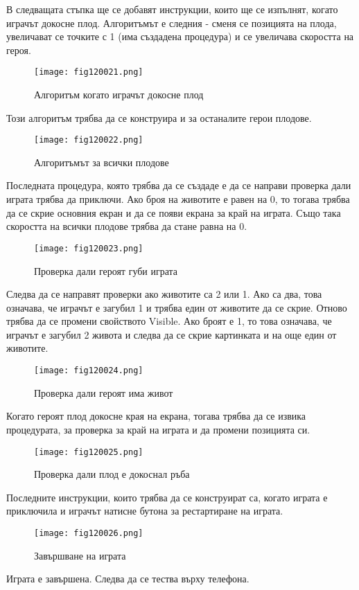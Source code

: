 В следващата стъпка ще се добавят инструкции, които ще се изпълнят, когато играчът докосне плод. Алгоритъмът е следния - сменя се позицията на плода, увеличават се точките с 1 (има създадена процедура) и се увеличава скоростта на героя.

\begin{figure}[H]
  \centering
  \texttt{[image: fig120021.png]}
  \caption{Алгоритъм когато играчът докосне плод}
\label{fig120021}
\end{figure}

Този алгоритъм трябва да се конструира и за останалите герои плодове.

\begin{figure}[H]
  \centering
  \texttt{[image: fig120022.png]}
  \caption{Алгоритъмът за всички плодове}
\label{fig120022}
\end{figure}

Последната процедура, която трябва да се създаде е да се направи проверка дали играта трябва да приключи. Ако броя на животите е равен на 0, то тогава трябва да се скрие основния екран и да се появи екрана за край на играта. Също така скоростта на всички плодове трябва да стане равна на 0.

\begin{figure}[H]
  \centering
  \texttt{[image: fig120023.png]}
  \caption{Проверка дали героят губи играта}
\label{fig120023}
\end{figure}

Следва да се направят проверки ако животите са 2 или 1. Ако са два, това означава, че играчът е загубил 1 и трябва един от животите да се скрие. Отново трябва да се промени свойството Visible. Ако броят е 1, то това означава, че играчът е загубил 2 живота и следва да се скрие картинката и на още един от животите.

\begin{figure}[H]
  \centering
  \texttt{[image: fig120024.png]}
  \caption{Проверка дали героят има живот}
\label{fig120024}
\end{figure}

Когато героят плод докосне края на екрана, тогава трябва да се извика процедурата, за проверка за край на играта и да промени позицията си.

\begin{figure}[H]
  \centering
  \texttt{[image: fig120025.png]}
  \caption{Проверка дали плод е докоснал ръба}
\label{fig120025}
\end{figure}

Последните инструкции, които трябва да се конструират са, когато играта е приключила и играчът натисне бутона за рестартиране на играта.

\begin{figure}[H]
  \centering
  \texttt{[image: fig120026.png]}
  \caption{Завършване на играта}
\label{fig120026}
\end{figure}

Играта е завършена. Следва да се тества върху телефона.
